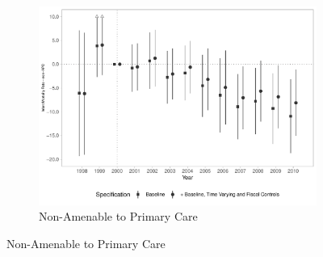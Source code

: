 \begin{figure}[h!]
\begin{center}
    \begin{subfigure}{0.32\textwidth}
        \centering
        \caption{\scriptsize Non-Amenable to Primary Care}\label{fig:16c}
        \includegraphics[width=\textwidth]{plots/tx_mi_nicsap_dist_ec29_baseline_dist_ec29_baseline_16.pdf}
    \end{subfigure}
    
    \end{center}
    
\end{figure}